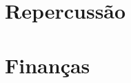 \documentclass[12pt]{article}
\begin{document}

\newpage

\section*{Repercussão}


\newpage

\section*{Finanças}

\end{document}
